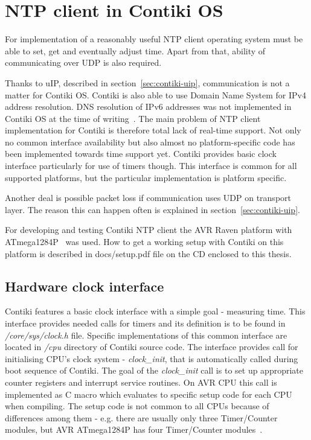 
\chapter{NTP client in Contiki OS}
For implementation of a reasonably useful NTP client
operating system must be able to set, get
and eventually adjust time.
Apart from that, ability of communicating over UDP is also required.

Thanks to uIP, described in section~\ref{sec:contiki-uip}, communication is
not a matter for Contiki OS.
Contiki is also able to use Domain Name System for IPv4 address resolution.
DNS resolution of IPv6 addresses was not implemented in Contiki OS
at the time of writing~\cite{contiki-docs}.
The main problem of NTP client implementation for Contiki is therefore total
lack of real-time support.
Not only no common interface availability but also
almost no platform-specific code has been implemented towards time support yet.
Contiki provides basic clock interface particularly for use of timers though.
This interface is common for all supported platforms,
but the particular implementation is platform specific.

Another deal is possible packet loss if communication uses UDP on transport layer.
The reason this can happen often is explained in section~\ref{sec:contiki-uip}.

For developing and testing Contiki NTP client the AVR Raven platform with ATmega1284P~\cite{avr-datasheet} was used.
How to get a working setup with Contiki on this platform is described in
docs/setup.pdf file on the CD enclosed to this thesis.

\section{Hardware clock interface}
Contiki features a basic clock interface with a simple goal - measuring time.
This interface provides needed calls for timers and its definition is to be found in {\it{/core/sys/clock.h}} file.
Specific implementations of this common interface are located in {\it{/cpu}} directory of Contiki source code.
The interface provides call for initialising CPU's clock system - {\it{clock\_init}}, that is automatically called during
boot sequence of Contiki.
The goal of the {\it{clock\_init}} call is to set up
appropriate counter registers and interrupt service routines. %
On AVR CPU this call is implemented as C macro which evaluates to specific setup code for each CPU
when compiling.
The setup code is not common to all CPUs because of differences among them - e.g. there are usually
only three Timer/Counter modules, but AVR ATmega1284P has four Timer/Counter modules~\cite{avr-datasheet}.

